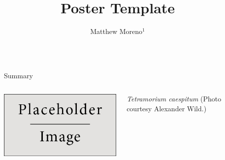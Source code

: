 \documentclass[final,table]{beamer}
\title{Poster Template} %
\author{Matthew Moreno$^{1}$} %
\institute{$^{1}$Michigan State University}%
\newlength{\sepwid}
\newlength{\onecolwid}
\begin{document}

\setlength{\belowcaptionskip}{2ex} %
\setlength\belowdisplayshortskip{2ex} %

\begin{frame}[t] %

\begin{columns}[t] %

\begin{column}{\sepwid}\end{column} %

\begin{column}{\onecolwid} %

\vspace{-3.5ex}
\begin{block}{Summary}
\vspace{-2.5ex}
{\small

}
\vspace{-0.5ex}
\begin{columns}[T, onlytextwidth]
\includegraphics[width=\textwidth]{img/placeholder}
\begin{spacing}{1.0}
{\small
\textit{Tetramorium caespitum} (Photo courtesy Alexander Wild.)}
\end{spacing}
\end{columns}
\end{block}


\end{column}
\end{columns}
\end{frame}
\end{document}
